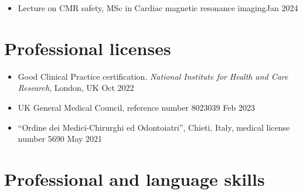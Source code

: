 \documentclass[
  11pt,
]
{article}
\providecommand{\tightlist}{%
  \setlength{\itemsep}{0pt}\setlength{\parskip}{0pt}}
\begin{document}
\begin{itemize}
\tightlist
\item
  Lecture on CMR safety, MSc in Cardiac magnetic resonance
  imaging\hfill Jan 2024
\end{itemize}

\section{Professional licenses}\label{professional-licenses}

\begin{itemize}
\tightlist
\item
  Good Clinical Practice certification. \emph{National Institute for
  Health and Care Research}, London, UK \hfill Oct 2022
\item
  UK General Medical Council, reference number 8023039 \hfill Feb 2023
\item
  ``Ordine dei Medici-Chirurghi ed Odontoiatri'', Chieti, Italy, medical
  license number 5690 \hfill May 2021
\end{itemize}

\section{Professional and language
skills}\label{professional-and-language-skills}
\end{document}
